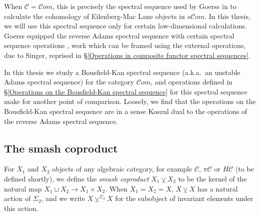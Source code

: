 \documentclass[11pt]{amsart} \renewcommand{\baselinestretch}{1.2}
\theoremstyle{plain}
\theoremstyle{definition}
\renewcommand{\to}{\longrightarrow}
\newcommand{\scrC}{\mathscr{C}}
\newcommand{\calc}{\mathcal{C}}
\newcommand{\citeBOX}[2][]{\cite[\mbox{#1}]{#2}}
\newcommand{\PA}[1]{\pi#1}
\newcommand{\HA}[1]{H#1}
\newcommand{\algs}{{\scrC\!\textit{om}}}
\newcommand{\smashcoprod}{\veebar}%
\begin{document}
\begin{Pi-algebras and cohomology algebras}
When $\calc=\algs$, this is precisely the spectral sequence used by Goerss in \cite[Chapter V]{MR1089001} to calculate the cohomology of Eilenberg-Mac Lane objects in $s\algs$. In this thesis, we will use this spectral sequence only for certain low-dimensional calculations. Goerss equipped the reverse Adams spectral sequence with certain spectral sequence operations \citeBOX[\S14]{MR1089001}, work which can be framed using the external operations, due to Singer, reprised in \S\ref{Operations in composite functor spectral sequences}. %

In this thesis we study a Bousfield-Kan spectral sequence (a.k.a.\ an unstable Adams spectral sequence) for the category $\algs$, and operations defined in \S\ref{Operations on the Bousfield-Kan spectral sequence} for this spectral sequence make for another point of comparison. Loosely, we find that the operations on the Bousfield-Kan spectral sequence are in a sense Koszul dual to the operations of the reverse Adams spectral sequence.

\subsection{The smash coproduct}\label{subseq:The smash coproduct}
For $X_1$ and $X_2$ objects of any algebraic category, for example $\calc$, $\PA{\calc}$ or $\HA{\calc}$ (to be defined shortly), we define the \emph{smash coproduct} $X_1\smashcoprod X_2$ to be the kernel of the natural map $X_1\sqcup X_2\to X_1\times X_2$. When $X_1=X_2=X$, $X\smashcoprod X$ has a natural action of $\Sigma_2$, and we write $X\smashcoprod^{\Sigma_2} X$ for the subobject of invariant elements under this action.


\end{Pi-algebras and cohomology algebras}
\end{document}
